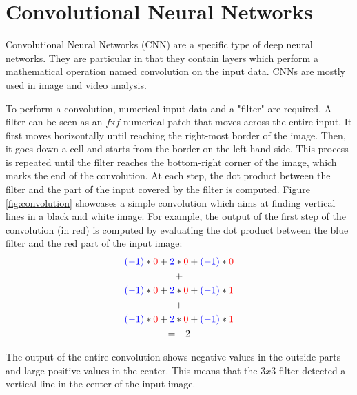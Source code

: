 \section{Convolutional Neural Networks}

\setlength{\marginparwidth}{3cm}\leavevmode {}Convolutional Neural Networks (CNN) are a specific type of deep neural networks. They are particular in that they contain layers which perform a mathematical operation named convolution on the input data. CNNs are mostly used in image and video analysis.

To perform a convolution, numerical input data and a "filter" are required. A filter can be seen as an $f$x$f$ numerical patch that moves across the entire input. It first moves horizontally until reaching the right-most border of the image. Then, it goes down a cell and starts from the border on the left-hand side. This process is repeated until the filter reaches the bottom-right corner of the image, which marks the end of the convolution. At each step, the dot product between the filter and the part of the input covered by the filter is computed. Figure \ref{fig:convolution} showcases a simple convolution which aims at finding vertical lines in a black and white image. For example, the output of the first step of the convolution (in red) is computed by evaluating the dot product between the blue filter and the red part of the input image: 
\begin{equation}
\begin{gathered}
\color{blue}(-1) \color{black}* \color{red}0 \color{black}+ \color{blue}2 \color{black}* \color{red}0 \color{black}+ \color{blue}(-1) \color{black}* \color{red}0
\\ \color{black}+ \\ 
\color{blue}(-1) \color{black}* \color{red}0 \color{black}+ \color{blue}2 \color{black}* \color{red}0 \color{black}+ \color{blue}(-1) \color{black}* \color{red}1 
\\ \color{black}+ \\ 
\color{blue}(-1) \color{black}* \color{red}0 \color{black}+ \color{blue}2 \color{black}* \color{red}0 \color{black}+ \color{blue}(-1) \color{black}* \color{red}1 
\\ \color{black}= -2
\end{gathered}
\end{equation}

\noindent The output of the entire convolution shows negative values in the outside parts and large positive values in the center. This means that the $3x3$ filter detected a vertical line in the center of the input image. 


